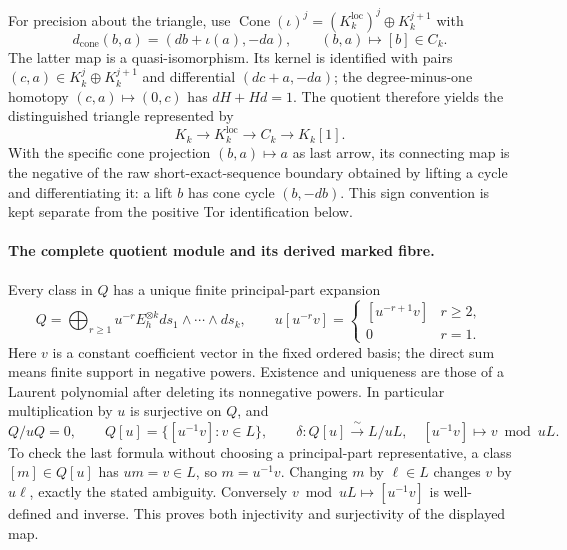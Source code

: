 For precision about the triangle, use
\(\operatorname{Cone}(\iota)^j
=(K_k^{\mathrm{loc}})^j\oplus K_k^{j+1}\) with
\[
 d_{\mathrm{cone}}(b,a)=(d b+\iota(a),-d a),\qquad
 (b,a)\longmapsto[b]\in C_k.                             \tag{MLT.9}
\]
The latter map is a quasi-isomorphism. Its kernel is
identified with pairs \((c,a)\in K_k^j\oplus K_k^{j+1}\)
and differential \((dc+a,-da)\); the degree-minus-one
homotopy \((c,a)\mapsto(0,c)\) has
\(dH+Hd=1\). The quotient therefore yields the
distinguished triangle represented by
\[
           K_k\longrightarrow K_k^{\mathrm{loc}}
                \longrightarrow C_k\longrightarrow K_k[1].
                                                               \tag{MLT.10}
\]
With the specific cone projection \((b,a)\mapsto a\)
as last arrow, its connecting map is the negative of
the raw short-exact-sequence boundary obtained by
lifting a cycle and differentiating it: a lift \(b\)
has cone cycle \((b,-db)\). This sign convention is
kept separate from the positive Tor identification below.

\paragraph{The complete quotient module and its derived marked fibre.}
Every class in \(Q\) has a unique finite principal-part
expansion
\[
 Q=\bigoplus_{r\ge1}u^{-r}E_h^{\otimes k}
                 ds_1\wedge\cdots\wedge ds_k,\qquad
 u[u^{-r}v]=
 \begin{cases}[u^{-r+1}v]&r\ge2,\\0&r=1.\end{cases}        \tag{MLT.11}
\]
Here \(v\) is a constant coefficient vector in the
fixed ordered basis; the direct sum means finite
support in negative powers. Existence and uniqueness
are those of a Laurent polynomial after deleting
its nonnegative powers. In particular multiplication
by \(u\) is surjective on \(Q\), and
\[
 Q/uQ=0,\qquad Q[u]=\{[u^{-1}v]:v\in L\},\qquad
 \delta:Q[u]\xrightarrow{\ \sim\ }L/uL,\quad
       [u^{-1}v]\longmapsto v\bmod uL.                   \tag{MLT.12}
\]
To check the last formula without choosing a
principal-part representative, a class \([m]\in Q[u]\)
has \(um=v\in L\), so \(m=u^{-1}v\).
Changing \(m\) by \(\ell\in L\) changes \(v\) by
\(u\ell\), exactly the stated ambiguity.
Conversely \(v\bmod uL\mapsto[u^{-1}v]\) is well-defined
and inverse. This proves both injectivity and
surjectivity of the displayed map.

